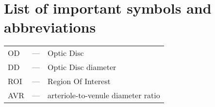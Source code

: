 \chapter*{List of important symbols and abbreviations}

\noindent
\begin{tabularx}{\textwidth}{p{1.25cm}p{0.75cm}X}
	OD				& ---	& Optic Disc \\
	DD				& ---	& Optic Disc diameter \\
	ROI				& ---	& Region Of Interest \\
	AVR				& ---	& arteriole-to-venule diameter ratio
\end{tabularx}


